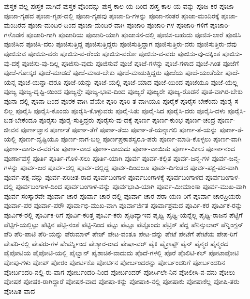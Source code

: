 {ಪುಸ್ತಕ-ವಲ್ಲ
ಪುಸ್ತಕ-ವಾಗಿದೆ
ಪುಸ್ತಕ-ವೊಂದನ್ನು
ಪುಸ್ತ-ಕಾಲ-ಯ-ದಿಂದ
ಪುಸ್ತ-ಕಾಲ-ಯ-ವನ್ನು
ಪೂಜ-ಕರ
ಪೂಜಾ
ಪೂಜಾ-ಗೃಹದ
ಪೂಜಾ-ಗೃಹ-ದಲ್ಲಿ
ಪೂಜಾ-ಗೃಹವು
ಪೂಜಾ-ದಿ-ಗಳನ್ನು
ಪೂಜಾ-ನಂತರ
ಪೂಜಾ-ಮಂದಿರಕ್ಕೆ
ಪೂಜಾ-ಮಂದಿರದ
ಪೂಜಾ-ಮಂದಿರ-ದಿಂದ
ಪೂಜಾ-ಮಂದಿರ-ವಾಗಿ
ಪೂಜಾರಿ
ಪೂಜಾರಿ-ಗಳ
ಪೂಜಾರಿ-ಗಳಿಗೆ
ಪೂಜಾರಿ-ಗಳೊಡನೆ
ಪೂಜಾರಿ-ಗಾಗಿ
ಪೂಜಾರಿಯ
ಪೂಜಾರಿ-ಯಾಗಿ
ಪೂಜಾಸನ-ದಲ್ಲಿ
ಪೂಜಿಸ-ಬಹುದು
ಪೂಜಿಸ-ಲಾರೆ
ಪೂಜಿಸಿ
ಪೂಜಿಸಿದ
ಪೂಜಿಸಿ-ದರು
ಪೂಜಿಸುತ್ತಿದ್ದ
ಪೂಜಿಸುತ್ತಿದ್ದರು
ಪೂಜಿಸುತ್ತಿದ್ದಾಗ
ಪೂಜಿಸುತ್ತಿರು-ವರು
ಪೂಜಿಸುತ್ತಿರು-ವೆವು
ಪೂಜಿಸುವ
ಪೂಜಿಸು-ವರು
ಪೂಜಿಸು-ವ-ರೆಂದು
ಪೂಜಿಸು-ವರೋ
ಪೂಜಿಸು-ವ-ವರು
ಪೂಜಿಸು-ವು-ದಕ್ಕಿಂತ
ಪೂಜಿಸು-ವು-ದಕ್ಕೆ
ಪೂಜಿಸು-ವು-ದಿಲ್ಲ
ಪೂಜಿಸು-ವುದು
ಪೂಜಿಸುವೆ
ಪೂಜೆ
ಪೂಜೆ-ಗಳನ್ನು
ಪೂಜೆ-ಗಳಾದ
ಪೂಜೆ-ಗಿಂತ
ಪೂಜೆಗೆ
ಪೂಜೆ-ಗೋಸ್ಕರ
ಪೂಜೆ-ಮಾಡದೆ
ಪೂಜೆ-ಮಾಡ-ಬೇಕು
ಪೂಜೆ-ಮಾಡುತ್ತಿದ್ದರು
ಪೂಜೆಯ
ಪೂಜೆ-ಯಂತೆಯೇ
ಪೂಜೆ-ಯನ್ನ
ಪೂಜೆ-ಯನ್ನಾ-ದರೂ
ಪೂಜೆ-ಯನ್ನು
ಪೂಜೆ-ಯಲ್ಲಿ
ಪೂಜೆ-ಯಾದ
ಪೂಜೆ-ಯಿಂದ
ಪೂಜೆಯೂ
ಪೂಜೆ-ಯೆಲ್ಲ
ಪೂಜ್ಯ
ಪೂಜ್ಯ-ದೃಷ್ಟಿ-ಯಿಂದ
ಪೂಜ್ಯನ್ತೇ
ಪೂಜ್ಯ-ಭಾವ-ದಿಂದ
ಪೂಜ್ಯರೆ
ಪೂಜ್ಯರೇ
ಪೂಜ್ಯ-ರೊಡನೆ
ಪೂತ-ವಾಗಿರ-ಬೇಕು
ಪೂನಾ-ದಲ್ಲಿ
ಪೂನಾ-ದಿಂದ
ಪೂರಕ-ವಾಗಿ-ವೆಯೇ
ಪೂರಿ
ಪೂರಿ-ತ-ವಾಗಿಯೂ
ಪೂರೈಕೆ
ಪೂರೈಸ-ಬೇಕೆಂದು
ಪೂರೈ-ಸ-ಲಿಲ್ಲ
ಪೂರೈಸಿ
ಪೂರೈಸಿ-ಕೊಂಡು
ಪೂರೈಸಿ-ಕೊಳ್ಳುವರು
ಪೂರೈ-ಸಿತು
ಪೂರೈ-ಸಿದ
ಪೂರೈಸಿ-ದರು
ಪೂರೈಸಿ-ದಳು
ಪೂರೈಸಿ-ಬಿಡ-ಬೇಕೆಂದೂ
ಪೂರೈಸು
ಪೂರೈ-ಸುತ್ತಿದ್ದರು
ಪೂರೈಸು-ವು-ದಕ್ಕೆ
ಪೂರ್ಣ
ಪೂರ್ಣ-ಕುಂಭ
ಪೂರ್ಣ-ಚಂದ್ರ
ಪೂರ್ಣ-ಜೀವನ
ಪೂರ್ಣಜ್ಞಾನ
ಪೂರ್ಣತೆ
ಪೂರ್ಣ-ತೆಗೆ
ಪೂರ್ಣ-ತೆಯ
ಪೂರ್ಣ-ತೆ-ಯನ್ನಾಗಲಿ
ಪೂರ್ಣ-ತೆ-ಯನ್ನು
ಪೂರ್ಣ-ತೆ-ಯಲ್ಲಿ
ಪೂರ್ಣ-ದೃಷ್ಟಿಯೂ
ಪೂರ್ಣ-ನಾಗ-ಬಲ್ಲ
ಪೂರ್ಣಪ್ರಕಾಶಸ್ವರೂ-ಪರು
ಪೂರ್ಣ-ಮಾಡಿ-ಕೊಳ್ಳಲು
ಪೂರ್ಣ-ವಾಗಿ
ಪೂರ್ಣ-ವಾಗು-ವ-ವರೆಗೂ
ಪೂರ್ಣ-ವಾದ
ಪೂರ್ಣ-ವಾದುದು
ಪೂರ್ಣ-ವಾಯಿತು
ಪೂರ್ಣ-ವಿಕಾಸ
ಪೂರ್ಣಾನಂದ
ಪೂರ್ಣಾವಸ್ಥೆ
ಪೂರ್ತಿ
ಪೂರ್ತಿ-ಗೊಳಿ-ಸಲು
ಪೂರ್ತಿ-ಯಾಗಿ
ಪೂರ್ವ
ಪೂರ್ವ-ಕಲ್ಪಿತ
ಪೂರ್ವ-ಜನ್ಮ-ಗಳ
ಪೂರ್ವ-ಜನ್ಮ-ಗಳನ್ನು
ಪೂರ್ವ-ಜರ
ಪೂರ್ವ-ದಲ್ಲಿ
ಪೂರ್ವ-ದಲ್ಲಿದ್ದ
ಪೂರ್ವ-ದಿಂದಲೂ
ಪೂರ್ವ-ದಿಗಂತದ
ಪೂರ್ವ-ಪಕ್ಷ-ಪರ-ವಾಗಿ
ಪೂರ್ವ-ಪಕ್ಷ-ವನ್ನು
ಪೂರ್ವ-ಪರಿಚಿತ-ರಾದ
ಪೂರ್ವಬಂಗಾಳ
ಪೂರ್ವಬಂಗಾಳಕ್ಕೆ
ಪೂರ್ವಬಂಗಾಳದ
ಪೂರ್ವಬಂಗಾಳ-ದಲ್ಲಿ
ಪೂರ್ವಬಂಗಾಳ-ದಿಂದ
ಪೂರ್ವಬಂಗಾಳ-ವನ್ನು
ಪೂರ್ವಭಾವಿ-ಯಾಗಿ
ಪೂರ್ವ-ಮೀಮಾಂಸಾ
ಪೂರ್ವ-ಮುಖ-ವಾಗಿ
ಪೂರ್ವ-ಸಂಸ್ಕಾರವೇ
ಪೂರ್ವಾ-ಚಾರ
ಪೂರ್ವಾ-ಚಾರ-ದಲ್ಲಿ
ಪೂರ್ವಾ-ಚಾರ-ಪರಾ-ಯಣ-ರಿಗೆ
ಪೂರ್ವಾ-ಚಾರಪ್ರಿಯರು
ಪೂರ್ವಾ-ಪರ
ಪೂರ್ವಾ-ಪರೌ
ಪೂರ್ವಾಭಿ-ಮುಖ-ವಾಗಿ
ಪೂರ್ವಾರ್ಜಿತ
ಪೂರ್ವಾಶ್ರಮದ
ಪೂರ್ವಿ-ಕರ
ಪೂರ್ವಿಕ-ರನ್ನು
ಪೂರ್ವಿಕ-ರಲ್ಲಿ
ಪೂರ್ವಿಕ-ರಿಗೆ
ಪೂರ್ವಿ-ಕರಿತ್ತ
ಪೂರ್ವಿ-ಕರು
ಪೃಥಿವ್ಯಾಇವ
ಪೃಥ್ವಿ
ಪೃಥ್ವಿ-ಯನ್ನೆಲ್ಲ
ಪೃಥ್ವಿ-ರಾಜನ
ಪೆಟ್ಟಿಗೆ
ಪೆಟ್ಟಿಗೆ-ಯಲ್ಲಿಟ್ಟು
ಪೆಟ್ಟಿನ
ಪೆಟ್ಟಿ-ನಂತೆ
ಪೆಟ್ಟಿ-ನಿಂದ
ಪೆಟ್ಟು
ಪೆಟ್ಟೂ
ಪೆಟ್ಟೊಂದು
ಪೆಟ್ರಿಕ್
ಪೆದ್ದ
ಪೆನಿನ್ಸುಲಾರ್
ಪೆನ್ನಿಂಗ್ಟನ್
ಪೆರಿ
ಪೆರಿ-ಪಾಟಿ
ಪೆರಿ-ಯನ್ನು
ಪೆರುಮಾಳ್
ಪೇಜ್
ಪೇಟ-ವಂತೂ
ಪೇಟ-ವನ್ನು
ಪೇಟೆ
ಪೇಟೆಗೆ
ಪೇಟೆಯ
ಪೇಪ-ರಿಗೆ
ಪೇಪರಿ-ನಲ್ಲಿ
ಪೇಪರು-ಗಳ
ಪೇಪರ್ಸ್ನಿಂದ
ಪೇಶ್ಕಾರ-ರಾದ
ಪೇಷಾ-ವರ್
ಪೈಕಿ
ಪೈಕ್ರಾಪ್ಟ್
ಪೈನ್
ಪೈನ್ಮರ
ಪೈನ್ಮರದ
ಪೈಪೋಟಿಯ
ಪೈಪೋಟಿ-ಯಲ್ಲಿ
ಪೈಲ್ವಾನ್
ಪೈಶಾಚಿಕ-ವಾದುದು
ಪೊದೆ-ಗಳಲ್ಲಿ
ಪೊರೆ
ಪೊಲಿಟಿ-ಕಲ್
ಪೋಟಾಪೋಟಿ
ಪೋಪು-ಗಳು
ಪೋಪ್
ಪೋರಂ
ಪೋರ್ಟಿಕೊ
ಪೋರ್ಟಿನ
ಪೋರ್ಬಂದರನ್ನು
ಪೋರ್ಬಂದರಿಗೆ
ಪೋರ್ಬಂದರಿನ
ಪೋರ್ಬಂದರಿ-ನಲ್ಲಿ-ರು-ವಾಗ
ಪೋರ್ಬಂದರಿ-ನಿಂದ
ಪೋರ್ಬಂದರ್
ಪೋರ್ಸಿಲೇ-ನಿನ
ಪೋಲೀಸಿ-ನ-ವನು
ಪೋಲು
ಪೋಷಕ
ಪೋಷಕ-ರಾಗಿದ್ದಾರೆ
ಪೋಷಕ-ವಾದ
ಪೋಷಾ-ಕನ್ನು
ಪೋಷಾಕಿ-ನಲ್ಲಿ
ಪೋಷಾಕು
ಪೋಷಾಕೆಲ್ಲ
ಪೋಷಿ-ತರು
ಪೋಷಿತ-ವಾದ
}
